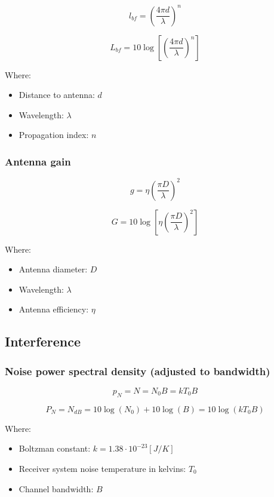 \documentclass[
	12pt,
	twoside
]{book}
\begin{document}
$$
	l_{bf} = \left( \frac {4 \pi d} {\lambda} \right)^n
$$

$$
	L_{bf} = 10 \log \left[ \left( \frac {4 \pi d} {\lambda} \right)^n \right]
$$

Where:

\begin{itemize}
	\item Distance to antenna: $d$
	\item Wavelength: $\lambda$
	\item Propagation index: $n$
\end{itemize}

\subsubsection{Antenna gain}

$$
	g = \eta \left( \frac {\pi D} {\lambda} \right)^2
$$

$$
	G = 10 \log \left[ \eta \left( \frac {\pi D} {\lambda} \right)^2 \right]
$$

Where:

\begin{itemize}
	\item Antenna diameter: $D$
	\item Wavelength: $\lambda$
	\item Antenna efficiency: $\eta$
\end{itemize}

\subsection{Interference}

\subsubsection{Noise power spectral density (adjusted to bandwidth)}

$$
	p_N = N = N_0 B = k T_0 B
$$

$$
	P_N = N_{dB} = 10 \log (N_0) + 10 \log (B) = 10 \log (k T_0 B)
$$

Where:

\begin{itemize}
	\item Boltzman constant: $k = 1.38 \cdot 10^{-23} [J/K]$
	\item Receiver system noise temperature in kelvins: $T_0$
	\item Channel bandwidth: $B$
\end{itemize}
\end{document}
